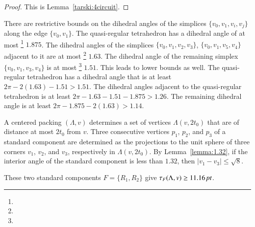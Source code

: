 \begin{proof} This is Lemma~\ref{tarski:4circuit}.
\end{proof}


There are restrictive bounds on the dihedral angles of the
simplices $\{v_0,v_1,v_i,v_j\}$ along the edge $\{v_0,v_1\}$. The
quasi-regular tetrahedron has a dihedral angle of at most%
\footnote{} $1.875$.  The dihedral angles of the
simplices $\{v_0,v_1,v_2,v_3\}$, $\{v_0,v_1,v_5,v_4\}$
adjacent to it are at most%
\footnote{}  $1.63$. The dihedral angle of the
remaining simplex $\{v_0,v_1,v_3,v_4\}$ is at most%
\footnote{} $1.51$.   This leads to lower bounds
as well. The quasi-regular tetrahedron has a dihedral angle that
is at least $2\pi - 2(1.63)-1.51 > 1.51$.  The dihedral angles
adjacent to the quasi-regular tetrahedron is at least $2\pi-
1.63-1.51-1.875> 1.26$. The remaining dihedral angle is at least
$2\pi-1.875-2(1.63) > 1.14$.

A centered packing $(\Lambda,v)$ determines a set of vertices $\Lambda(v,2t_0)$ that
are of distance at most $2t_0$ from $v$.  Three
consecutive vertices $p_1$, $p_2$, and $p_3$ of a standard component
are determined as the projections to the unit sphere of three
corners $v_1$, $v_2$, and $v_3$, respectively in $\Lambda(v,2t_0)$. By
Lemma~\ref{lemma:1.32}, if the interior angle of the standard
component is less than $1.32$, then $|v_1-v_3|\le\sqrt{8}$.

\begin{lemma} 
These two standard components $F=\{R_1,R_2\}$ give
    $\tau_F(\Lambda,v) \ge 11.16\,\hbox{\it pt}$.
\end{lemma}

